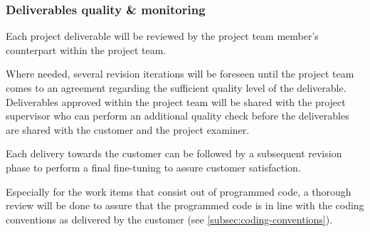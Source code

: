\subsubsection{Deliverables quality \& monitoring}
Each project deliverable will be reviewed by the project team member's counterpart within the project team.

Where needed, several revision iterations will be foreseen until the project team comes to an agreement regarding the sufficient quality level of the deliverable.
Deliverables approved within the project team will be shared with the project supervisor who can perform an additional quality check before the deliverables are shared with the customer and the project examiner.

Each delivery towards the customer can be followed by a subsequent revision phase to perform a final fine-tuning to assure customer satisfaction.

Especially for the work items that consist out of programmed code, a thorough review will be done to assure that the programmed code is in line with the coding conventions as delivered by the customer (see \autoref{subsec:coding-conventions}).
